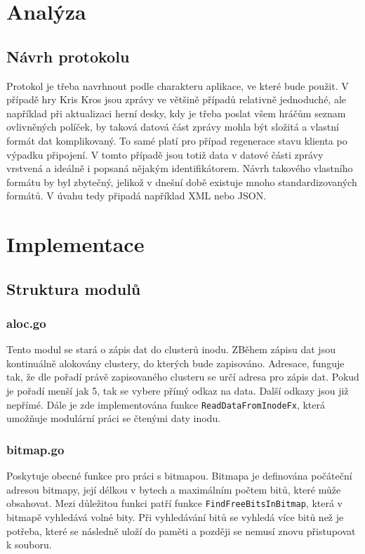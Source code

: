 \documentclass[12pt, a4paper]{article}
\let\oldsection\section
\renewcommand\section{\clearpage\oldsection}
\begin{document}
    \section{Analýza}
    \subsection{Návrh protokolu}
    	Protokol je třeba navrhnout podle charakteru aplikace, ve které bude použit. V případě hry Kris Kros jsou zprávy ve většině případů relativně jednoduché, ale například při aktualizaci herní desky, kdy je třeba poslat všem hráčům seznam ovlivněných políček, by taková datová část zprávy mohla být složitá a vlastní formát dat komplikovaný. To samé platí pro případ regenerace stavu klienta po výpadku připojení. V tomto případě jsou totiž data v datové části zprávy vrstvená a ideálně i popsaná nějakým identifikátorem. Návrh takového vlastního formátu by byl zbytečný, jelikož v dnešní době existuje mnoho standardizovaných formátů. V úvahu tedy připadá například XML nebo JSON.
   
	

    \section{Implementace}

		    \subsection{Struktura modulů}
			\subsubsection{aloc.go}
			Tento modul se stará o zápis dat do clusterů inodu. ZBěhem zápisu dat jsou kontinuálně alokovány clustery, do kterých bude zapisováno. Adresace, funguje tak, že dle pořadí právě zapisovaného clusteru se určí adresa pro zápis dat. Pokud je pořadí menší jak 5, tak se vybere přímý odkaz na data. Další odkazy jsou již nepřímé. Dále je zde implementována funkce \texttt{ReadDataFromInodeFx}, která umožňuje modulární práci se čtenými daty inodu.

			\subsubsection{bitmap.go}
			Poskytuje obecné funkce pro práci s bitmapou. Bitmapa je definována počáteční adresou bitmapy, její délkou v bytech a maximálním počtem bitů, které může obsahovat. Mezi důležitou funkci patří funkce \texttt{FindFreeBitsInBitmap}, která v bitmapě vyhledává volné bity. Při vyhledávání bitů se vyhledá více bitů než je potřeba, které se následně uloží do paměti a později se nemusí znovu přistupovat k souboru.
\end{document}
